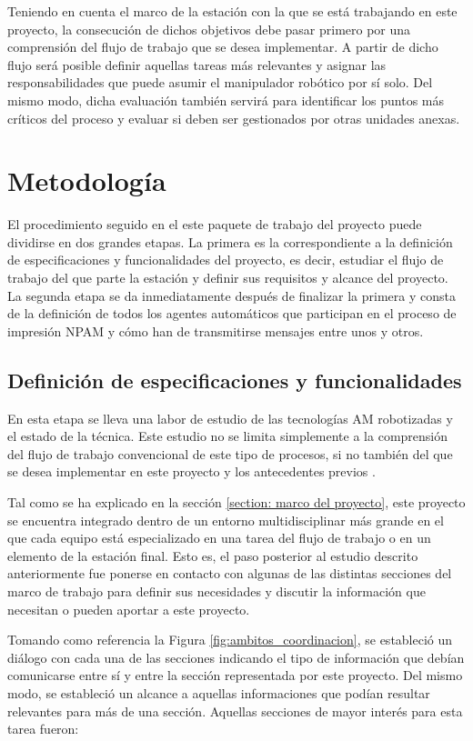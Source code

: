 Teniendo en cuenta el marco de la estación con la que se está trabajando en este proyecto, la consecución de dichos objetivos debe pasar primero por una comprensión del flujo de trabajo que se desea implementar. A partir de dicho flujo será posible definir aquellas tareas más relevantes y asignar las responsabilidades que puede asumir el manipulador robótico por sí solo. Del mismo modo, dicha evaluación también servirá para identificar los puntos más críticos del proceso y evaluar si deben ser gestionados por otras unidades anexas.

\section{Metodología}
El procedimiento seguido en el este paquete de trabajo del proyecto puede dividirse en dos grandes etapas. La primera es la correspondiente a la definición de especificaciones y funcionalidades del proyecto, es decir, estudiar el flujo de trabajo del que parte la estación y definir sus requisitos y alcance del proyecto. La segunda etapa se da inmediatamente después de finalizar la primera y consta de la definición de todos los agentes automáticos que participan en el proceso de impresión \acrshort{NPAM} y cómo han de transmitirse mensajes entre unos y otros.

\subsection{Definición de especificaciones y funcionalidades}

En esta etapa se lleva una labor de estudio de las tecnologías \acrshort{AM} robotizadas y el estado de la técnica. Este estudio no se limita simplemente a la comprensión del flujo de trabajo convencional de este tipo de procesos, si no también del que se desea implementar en este proyecto y los antecedentes previos \cite{TFM_SanchoAmparo}\cite{TFM_Lu}.

Tal como se ha explicado en la sección \ref{section:  marco del proyecto}, este proyecto se encuentra integrado dentro de un entorno multidisciplinar más grande en el que cada equipo está especializado en una tarea del flujo de trabajo o en un elemento de la estación final. Esto es, el paso posterior al estudio descrito anteriormente fue ponerse en contacto con algunas de las distintas secciones del marco de trabajo para definir sus necesidades y discutir la información que necesitan o pueden aportar a este proyecto. 

Tomando como referencia la Figura \ref{fig:ambitos_coordinacion}, se estableció un diálogo con cada una de las secciones indicando el tipo de información que debían comunicarse entre sí y entre la sección representada por este proyecto. Del mismo modo, se estableció un alcance a aquellas informaciones que podían resultar relevantes para más de una sección. Aquellas secciones de mayor interés para esta tarea fueron:

